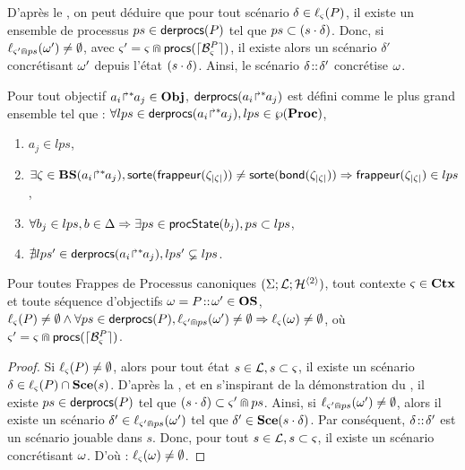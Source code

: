 D'après le , on peut déduire que pour tout scénario $\delta \in \ell_\varsigma(P)$,
il existe un ensemble de processus $ps \in \mathsf{derprocs}(P)$ tel que $ps \subset (s \cdot \delta)$.
Donc, si $\ell_{\varsigma' \Cap ps}(\omega') \neq \emptyset$,
avec $\varsigma' = \varsigma \Cap \mathsf{procs}(\lceil \mathcal{B}_{\varsigma}^{P}\rceil)$,
il existe alors un scénario $\delta'$ concrétisant $\omega'$ depuis l'état $(s \cdot \delta)$.
Ainsi, le scénario  $\delta \!::\! \delta'$ concrétise $\omega$.

\begin{definition}[$\derprocs : \Obj \to \powerset(\powerset(\Proc))$]
  Pour tout objectif ${a_i\!\Rsh^*\!\!a_j} \in \mathbf{Obj}$, $\mathsf{derprocs}({a_i\!\Rsh^*\!\!a_j})$
  est défini comme le plus grand ensemble tel que :
  $\forall lps \in \mathsf{derprocs}({a_i\!\Rsh^*\!\!a_j}), lps \in \wp(\mathbf{Proc})$,
  \begin{enumerate}
    \item $a_j \in lps$,
    \item $\exists \zeta \in \mathbf{BS}({a_i\!\Rsh^*\!\!a_j}),
        \mathsf{sorte}(\mathsf{frappeur}(\zeta_{|\zeta|})) \neq \mathsf{sorte}(\mathsf{bond}(\zeta_{|\zeta|}))
        \Rightarrow \mathsf{frappeur}(\zeta_{|\zeta|}) \in lps$,
    \item $\forall b_j \in lps, b \in \Delta \Rightarrow \exists ps \in \mathsf{procState}(b_j), ps \subset lps$,
    \item $\nexists lps'\in \mathsf{derprocs}({a_i\!\Rsh^*\!\!a_j}), lps' \varsubsetneq lps$.
  \end{enumerate}
\end{definition}

\begin{theorem}
  Pour toutes Frappes de Processus canoniques $(\Sigma; \mathcal{L}; \mathcal{H}^{\langle 2 \rangle})$,
  tout contexte $\varsigma \in \mathbf{Ctx}$ et toute séquence d'objectifs $\omega = P \!::\! \omega' \in \mathbf{OS}$,
  $\ell_\varsigma(P) \neq \emptyset \wedge \forall ps \in \mathsf{derprocs}(P),
    \ell_{\varsigma' \Cap ps}(\omega') \neq \emptyset
    \Rightarrow \ell_\varsigma(\omega) \neq \emptyset$,
  où $\varsigma' = \varsigma \Cap \mathsf{procs}(\lceil \mathcal{B}_{\varsigma}^{P}\rceil)$.
\end{theorem}

\begin{proof} %
  Si $\ell_\varsigma(P) \neq \emptyset$, alors pour tout état $s \in \mathcal{L}, s \subset \varsigma$,
  il existe un scénario $\delta \in \ell_\varsigma(P) \cap \mathbf{Sce}(s)$.
  D'après la ,
  et en s'inspirant de la démonstration du ,
  il existe $ps \in \mathsf{derprocs}(P)$ tel que $(s \cdot \delta) \subset \varsigma' \Cap ps$.
  Ainsi, si $\ell_{\varsigma' \Cap ps}(\omega') \neq \emptyset$,
  alors il existe un scénario $\delta' \in \ell_{\varsigma' \Cap ps}(\omega')$ tel que
  $\delta' \in \mathbf{Sce}(s \cdot \delta)$.
  Par conséquent, $\delta \!::\! \delta'$ est un scénario jouable dans $s$.
  Donc, pour tout $s \in \mathcal{L}, s \subset \varsigma$, il existe un scénario concrétisant $\omega$.
  D'où : $\ell_\varsigma(\omega) \neq \emptyset$.
\end{proof}


